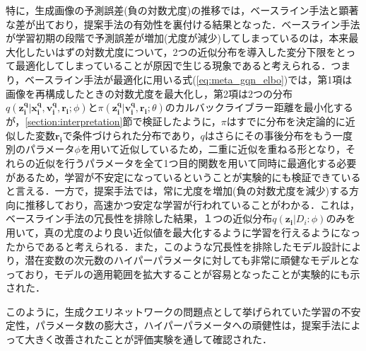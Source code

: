 特に，生成画像の予測誤差(負の対数尤度)の推移では，ベースライン手法と顕著な差が出ており，提案手法の有効性を裏付ける結果となった．ベースライン手法が学習初期の段階で予測誤差が増加(尤度が減少)してしまっているのは，本来最大化したいはずの対数尤度について，2つの近似分布を導入した変分下限をとって最適化してしまっていることが原因で生じる現象であると考えられる．つまり，ベースライン手法が最適化に用いる式(\ref{eq:meta_gqn_elbo})では，第1項は画像を再構成したときの対数尤度を最大化し，第2項は2つの分布$q(\bm{z_i^q}|\bm{x_i^q}, \bm{v_i^q}, \bm{r_i}; \phi)$と$\pi (\bm{z_i^q} | \bm{v_i^q}, \bm{r_i}; \theta)$のカルバックライブラー距離を最小化するが，\ref{section:interpretation}節で検証したように，$\pi$はすでに分布を決定論的に近似した変数$\bm{r_i}$で条件づけられた分布であり，$q$はさらにその事後分布をもう一度別のパラメータ$\phi$を用いて近似しているため，二重に近似を重ねる形となり，それらの近似を行うパラメータを全て1つ目的関数を用いて同時に最適化する必要があるため，学習が不安定になっているということが実験的にも検証できていると言える．一方で，提案手法では，常に尤度を増加(負の対数尤度を減少)する方向に推移しており，高速かつ安定な学習が行われていることがわかる．これは，ベースライン手法の冗長性を排除した結果，１つの近似分布$q(\bm{z_i}|D_i:\phi)$のみを用いて，真の尤度のより良い近似値を最大化するように学習を行えるようになったからであると考えられる．また，このような冗長性を排除したモデル設計により，潜在変数の次元数のハイパーパラメータに対しても非常に頑健なモデルとなっており，モデルの適用範囲を拡大することが容易となったことが実験的にも示された．

このように，生成クエリネットワークの問題点として挙げられていた学習の不安定性，パラメータ数の膨大さ，ハイパーパラメータへの頑健性は，提案手法によって大きく改善されたことが評価実験を通して確認された．